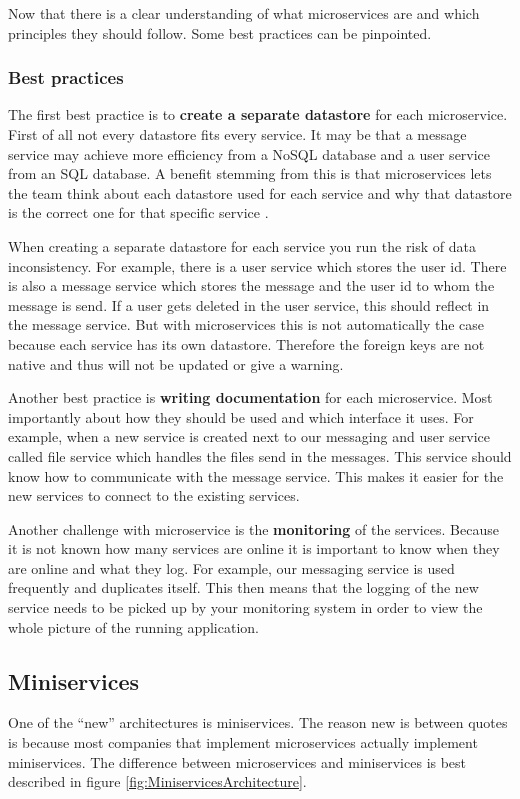 Now that there is a clear understanding of what microservices are and which principles
they should follow. Some best practices can be pinpointed.

\subsubsection{Best practices}
The first best practice is to \textbf{create a separate datastore} for each microservice. First of all not every datastore fits every service. It may be that a message service may achieve more efficiency from a NoSQL database and a user service from an SQL database. A benefit stemming from this is that microservices lets the team think about each datastore used for each service and why that datastore is the correct one for that specific service \cite{microservicesNetflix}.

When creating a separate datastore for each service you run the risk of data inconsistency. For example, there is a user service which stores the user id. There is also a message service which stores the message and the user id to whom the message is send. If a user gets deleted in the user service, this should reflect in the message service. But with microservices this is not automatically the case because each service has its own datastore. Therefore the foreign keys are not native and thus will not be updated or give a warning.

Another best practice is \textbf{writing documentation} \cite{microservicesBestPractice} for each microservice. Most importantly about how they should be used and which interface it uses. For example, when a new service is created next to our messaging and user service called file service which handles the files send in the messages. This service should know how to communicate with the message service. This makes it easier for the new services to connect to the existing services.

Another challenge with microservice is the \textbf{monitoring} \cite{microservicesBestPractice} of the services. Because it is not known how many services are online it is important to know when they are online and what they log. For example, our messaging service is used frequently and duplicates itself. This then means that the logging of the new service needs to be picked up by your monitoring system in order to view the whole picture of the running application.

\subsection{Miniservices}
One of the “new” architectures is miniservices. The reason new is between quotes is because most companies that implement microservices actually implement miniservices. The difference between microservices and miniservices is best described in figure \ref{fig:MiniservicesArchitecture}.

